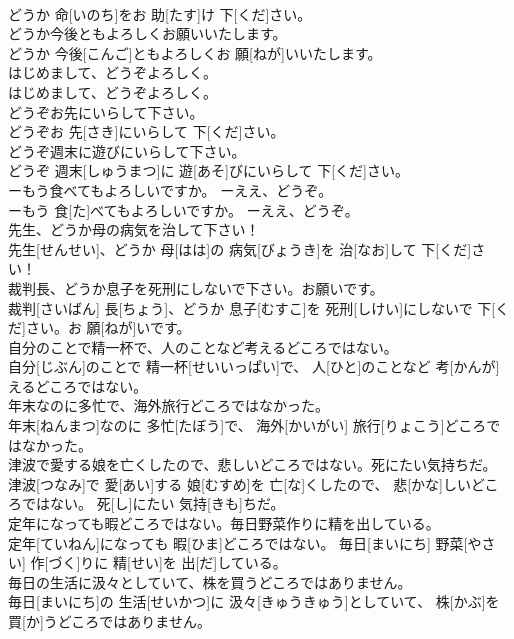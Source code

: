 \documentclass[8pt]{extreport}
\begin{document}
\begin{CJK}{UTF8}{min}
\\	どうか 命[いのち]をお 助[たす]け 下[くだ]さい。
\\	どうか今後ともよろしくお願いいたします。	
\\	どうか 今後[こんご]ともよろしくお 願[ねが]いいたします。
\\	はじめまして、どうぞよろしく。	
\\	はじめまして、どうぞよろしく。
\\	どうぞお先にいらして下さい。	
\\	どうぞお 先[さき]にいらして 下[くだ]さい。
\\	どうぞ週末に遊びにいらして下さい。	
\\	どうぞ 週末[しゅうまつ]に 遊[あそ]びにいらして 下[くだ]さい。
\\	ーもう食べてもよろしいですか。 ーええ、どうぞ。	
\\	ーもう 食[た]べてもよろしいですか。 ーええ、どうぞ。
\\	先生、どうか母の病気を治して下さい！	
\\	先生[せんせい]、どうか 母[はは]の 病気[びょうき]を 治[なお]して 下[くだ]さい！
\\	裁判長、どうか息子を死刑にしないで下さい。お願いです。	
\\	裁判[さいばん] 長[ちょう]、どうか 息子[むすこ]を 死刑[しけい]にしないで 下[くだ]さい。お 願[ねが]いです。
\\	自分のことで精一杯で、人のことなど考えるどころではない。	
\\	自分[じぶん]のことで 精一杯[せいいっぱい]で、 人[ひと]のことなど 考[かんが]えるどころではない。
\\	年末なのに多忙で、海外旅行どころではなかった。	
\\	年末[ねんまつ]なのに 多忙[たぼう]で、 海外[かいがい] 旅行[りょこう]どころではなかった。
\\	津波で愛する娘を亡くしたので、悲しいどころではない。死にたい気持ちだ。	
\\	津波[つなみ]で 愛[あい]する 娘[むすめ]を 亡[な]くしたので、 悲[かな]しいどころではない。 死[し]にたい 気持[きも]ちだ。
\\	定年になっても暇どころではない。毎日野菜作りに精を出している。	
\\	定年[ていねん]になっても 暇[ひま]どころではない。 毎日[まいにち] 野菜[やさい] 作[づく]りに 精[せい]を 出[だ]している。
\\	毎日の生活に汲々としていて、株を買うどころではありません。	
\\	毎日[まいにち]の 生活[せいかつ]に 汲々[きゅうきゅう]としていて、 株[かぶ]を 買[か]うどころではありません。

\end{CJK}
\end{document}
